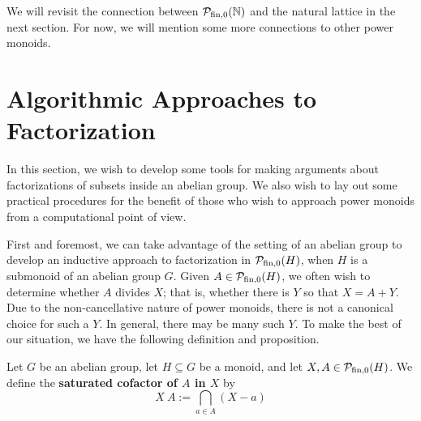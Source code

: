 We will revisit the connection between ${\mathcal{P}_{\textrm{fin},0}(\mathbb{N})}$ and the natural lattice in the next section.
For now, we will mention some more connections to other power monoids.







\section{Algorithmic Approaches to Factorization}
In this section, we wish to develop some tools for making arguments about factorizations of subsets inside an abelian group.  
We also wish to lay out some practical procedures for the benefit of those who wish to approach power monoids from a computational point of view.


First and foremost, we can take advantage of the setting of an abelian group to develop an inductive approach to factorization in $\mathcal{P}_{\textrm{fin}, 0}(H)$, when $H$ is a submonoid of an abelian group $G$.
Given $A\in \mathcal{P}_{\textrm{fin}, 0}(H)$, we often wish to determine whether $A$ divides $X$; that is, whether there is $Y$ so that $X = A+Y$.
Due to the non-cancellative nature of power monoids, there is not a canonical choice for such a $Y$.
In general, there may be many such $Y$.
To make the best of our situation, we have the following definition and proposition.

\begin{defn} \label{def:cofactor}
	Let $G$ be an abelian group, let $H \subseteq G$ be a monoid, and let $X,A\in \mathcal{P}_{\textrm{fin},0}(H)$.
	We define the \textbf{saturated cofactor of $A$ in $X$} by
	\[ X\:A := \bigcap_{a\in A} (X-a) \]
\end{defn}

